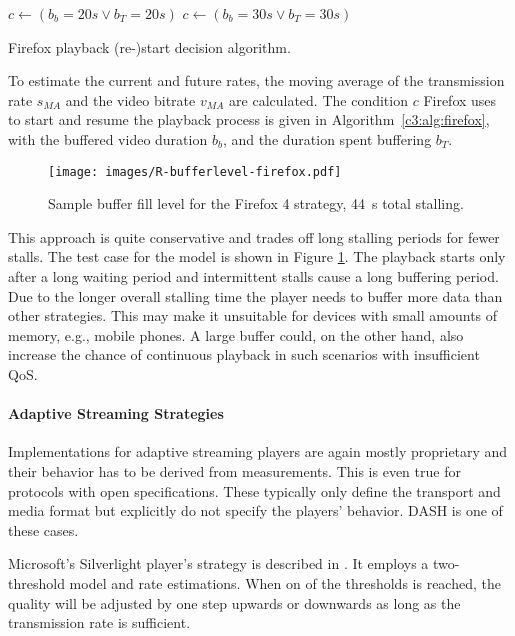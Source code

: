 \begin{algorithm}[htb]
	\centering
	\begin{algorithmic}
		\STATE $c \gets ( b_b=20s \lor b_T=20s )$
	\ELSE
		\STATE $c \gets ( b_b=30s \lor b_T=30s )$
	\ENDIF
	\end{algorithmic}
	\caption{Firefox playback (re-)start decision algorithm.}
\label{c3:alg:firefox}
\end{algorithm}

To estimate the current and future rates, the moving average of the transmission rate $s_{MA}$ and the video bitrate $v_{MA}$ are calculated. The condition $c$ Firefox uses to start and resume the playback process is given in Algorithm~\ref{c3:alg:firefox}, with the buffered video duration $b_b$, and the duration spent buffering $b_T$.

 \begin{figure}[htb]
	\centering
	\texttt{[image: images/R-bufferlevel-firefox.pdf]}
	\caption{Sample buffer fill level for the Firefox 4 strategy, \SI{44}{\second} total stalling.}
\label{c3:fig:bufferlevel-firefox}
\end{figure}

This approach is quite conservative and trades off long stalling periods for fewer stalls. The test case for the model is shown in Figure \ref{c3:fig:bufferlevel-firefox}. The playback starts only after a long waiting period and intermittent stalls cause a long buffering period. Due to the longer overall stalling time the player needs to buffer more data than other strategies. This may make it unsuitable for devices with small amounts of memory, e.g., mobile phones. A large buffer could, on the other hand, also increase the chance of continuous playback in such scenarios with insufficient \gls{QoS}.


\paragraph{Adaptive Streaming Strategies}

Implementations for adaptive streaming players are again mostly proprietary and their behavior has to be derived from measurements. This is even true for protocols with open specifications. These typically only define the transport and media format but explicitly do not specify the players' behavior. \Gls{DASH} is one of these cases.

Microsoft's Silverlight player's strategy is described in \cite{BLTJ:BLTJ20505}. It employs a two-threshold model and rate estimations. When on of the thresholds is reached, the quality will be adjusted by one step upwards or downwards as long as the transmission rate is sufficient.

